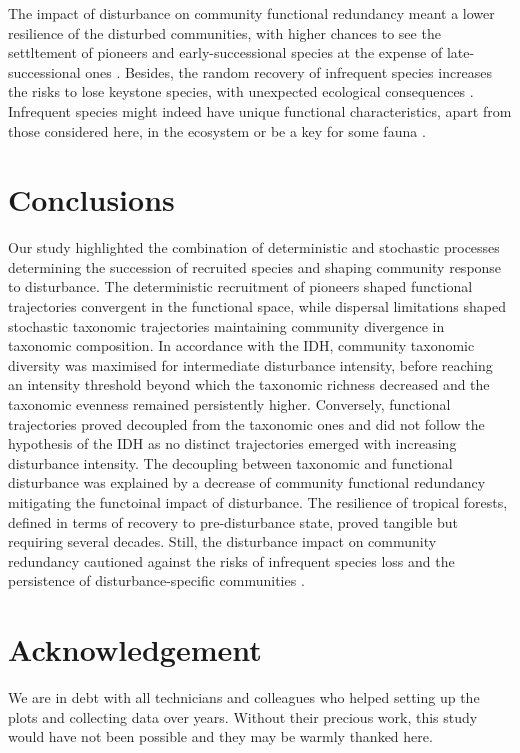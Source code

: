 \documentclass[fleqn,10pt]{ArtEcoFoG} %
\begin{document}
The impact of disturbance on community functional redundancy meant a
lower resilience of the disturbed communities, with higher chances to
see the settltement of pioneers and early-successional species at the
expense of late-successional ones \citep{Haddad2008}. Besides, the
random recovery of infrequent species increases the risks to lose
keystone species, with unexpected ecological consequences
\citep{Jones1994, Chazdon2003a, Diaz2005}. Infrequent species might
indeed have unique functional characteristics, apart from those
considered here, in the ecosystem or be a key for some fauna
\citep{Schleuning2016}.

\section{Conclusions}\label{conclusions}

Our study highlighted the combination of deterministic and stochastic
processes determining the succession of recruited species and shaping
community response to disturbance. The deterministic recruitment of
pioneers shaped functional trajectories convergent in the functional
space, while dispersal limitations shaped stochastic taxonomic
trajectories maintaining community divergence in taxonomic composition.
In accordance with the IDH, community taxonomic diversity was maximised
for intermediate disturbance intensity, before reaching an intensity
threshold beyond which the taxonomic richness decreased and the
taxonomic evenness remained persistently higher. Conversely, functional
trajectories proved decoupled from the taxonomic ones and did not follow
the hypothesis of the IDH as no distinct trajectories emerged with
increasing disturbance intensity. The decoupling between taxonomic and
functional disturbance was explained by a decrease of community
functional redundancy mitigating the functoinal impact of disturbance.
The resilience of tropical forests, defined in terms of recovery to
pre-disturbance state, proved tangible but requiring several decades.
Still, the disturbance impact on community redundancy cautioned against
the risks of infrequent species loss and the persistence of
disturbance-specific communities \citep{Herault2018}.

\section{Acknowledgement}\label{acknowledgement}

We are in debt with all technicians and colleagues who helped setting up
the plots and collecting data over years. Without their precious work,
this study would have not been possible and they may be warmly thanked
here.
\end{document}

